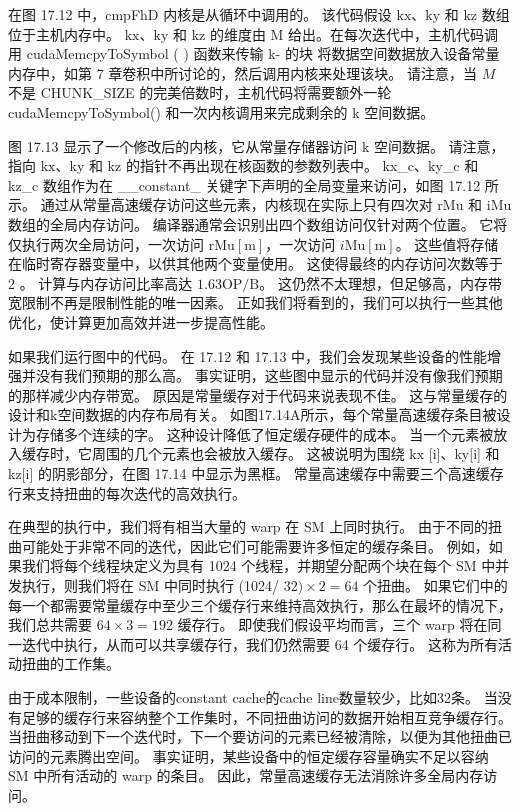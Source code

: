 在图 17.12 中，cmpFhD 内核是从循环中调用的。 该代码假设 $\mathrm{kx}、\mathrm{ky}$ 和 $\mathrm{kz}$ 数组位于主机内存中。 $\mathrm{kx}、\mathrm{ky}$ 和 $\mathrm{kz}$ 的维度由 M 给出。在每次迭代中，主机代码调用 cudaMemcpyToSymbol ( ) 函数来传输 k- 的块 将数据空间数据放入设备常量内存中，如第 7 章卷积中所讨论的，然后调用内核来处理该块。 请注意，当 $M$ 不是 CHUNK\_SIZE 的完美倍数时，主机代码将需要额外一轮 cudaMemcpyToSymbol() 和一次内核调用来完成剩余的 k 空间数据。

图 17.13 显示了一个修改后的内核，它从常量存储器访问 k 空间数据。 请注意，指向 $\mathrm{kx}$、ky 和 $\mathrm{kz}$ 的指针不再出现在核函数的参数列表中。 kx\_c、ky\_c 和 kz\_c 数组作为在 \_\_constant\_ 关键字下声明的全局变量来访问，如图 17.12 所示。 通过从常量高速缓存访问这些元素，内核现在实际上只有四次对 rMu 和 iMu 数组的全局内存访问。 编译器通常会识别出四个数组访问仅针对两个位置。 它将仅执行两次全局访问，一次访问 $\mathrm{rMu}[\mathrm{m}]$，一次访问 $i \mathrm{Mu}[\mathrm{m}]$。 这些值将存储在临时寄存器变量中，以供其他两个变量使用。 这使得最终的内存访问次数等于 2 。 计算与内存访问比率高达 $1.63 \mathrm{OP} / \mathrm{B}$。 这仍然不太理想，但足够高，内存带宽限制不再是限制性能的唯一因素。 正如我们将看到的，我们可以执行一些其他优化，使计算更加高效并进一步提高性能。

如果我们运行图中的代码。 在 17.12 和 17.13 中，我们会发现某些设备的性能增强并没有我们预期的那么高。 事实证明，这些图中显示的代码并没有像我们预期的那样减少内存带宽。 原因是常量缓存对于代码来说表现不佳。 这与常量缓存的设计和k空间数据的内存布局有关。 如图17.14A所示，每个常量高速缓存条目被设计为存储多个连续的字。 这种设计降低了恒定缓存硬件的成本。 当一个元素被放入缓存时，它周围的几个元素也会被放入缓存。 这被说明为围绕 $\mathrm{kx}$ [i]、ky[i] 和 kz[i] 的阴影部分，在图 17.14 中显示为黑框。 常量高速缓存中需要三个高速缓存行来支持扭曲的每次迭代的高效执行。

在典型的执行中，我们将有相当大量的 warp 在 SM 上同时执行。 由于不同的扭曲可能处于非常不同的迭代，因此它们可能需要许多恒定的缓存条目。 例如，如果我们将每个线程块定义为具有 1024 个线程，并期望分配两个块在每个 SM 中并发执行，则我们将在 SM 中同时执行 (1024/ $32) \times 2=64$ 个扭曲。 如果它们中的每一个都需要常量缓存中至少三个缓存行来维持高效执行，那么在最坏的情况下，我们总共需要 $64 \times 3=192$ 缓存行。 即使我们假设平均而言，三个 warp 将在同一迭代中执行，从而可以共享缓存行，我们仍然需要 64 个缓存行。 这称为所有活动扭曲的工作集。

由于成本限制，一些设备的constant cache的cache line数量较少，比如32条。 当没有足够的缓存行来容纳整个工作集时，不同扭曲访问的数据开始相互竞争缓存行。 当扭曲移动到下一个迭代时，下一个要访问的元素已经被清除，以便为其他扭曲已访问的元素腾出空间。 事实证明，某些设备中的恒定缓存容量确实不足以容纳 SM 中所有活动的 warp 的条目。 因此，常量高速缓存无法消除许多全局内存访问。

